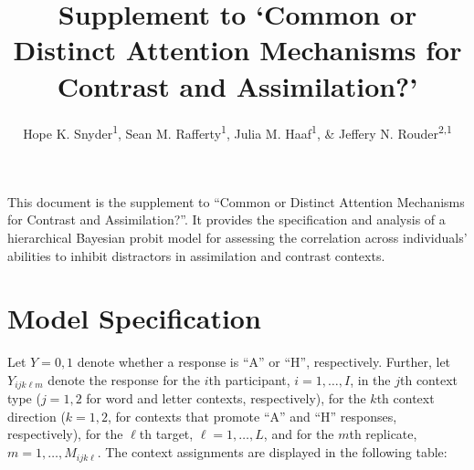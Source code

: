 \documentclass[english,man]{apa6}
\title{Supplement to `Common or Distinct Attention Mechanisms for Contrast and
Assimilation?'}
\author{Hope K. Snyder\textsuperscript{1}, Sean M. Rafferty\textsuperscript{1}, Julia M. Haaf\textsuperscript{1}, \& Jeffery N. Rouder\textsuperscript{2,1}}
\affiliation{
    \vspace{0.5cm}
          \textsuperscript{1} University of Missouri\\
          \textsuperscript{2} University of California, Irvine  }
\begin{document}
\maketitle

\setcounter{secnumdepth}{0}



This document is the supplement to \enquote{Common or Distinct Attention
Mechanisms for Contrast and Assimilation?}. It provides the
specification and analysis of a hierarchical Bayesian probit model for
assessing the correlation across individuals' abilities to inhibit
distractors in assimilation and contrast contexts.

\section{Model Specification}\label{model-specification}

Let \(Y=0,1\) denote whether a response is \enquote{A} or \enquote{H},
respectively. Further, let \(Y_{ijk\ell m}\) denote the response for the
\(i\)th participant, \(i=1,\ldots,I\), in the \(j\)th context type
(\(j=1,2\) for word and letter contexts, respectively), for the \(k\)th
context direction (\(k=1,2\), for contexts that promote \enquote{A} and
\enquote{H} responses, respectively), for the \(\ell\)th target,
\(\ell=1,\ldots,L\), and for the \(m\)th replicate,
\(m=1,\ldots ,M_{ijk\ell}\). The context assignments are displayed in
the following table:
\end{document}
